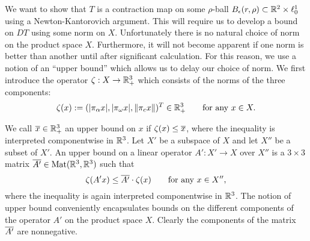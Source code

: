 We want to show that $T$ is a contraction map on some $\rho$-ball 
$B_\epsilon(r,\rho) \subset \mathbb{R}^2 \times \ell^1_0$ using a Newton-Kantorovich argument. 
This will require us to develop a bound on $DT$ using some norm on  $ X$.  
Unfortunately there is no natural choice of norm on the product space $ X$. 
Furthermore, it will not become apparent if one norm is better than another until after  significant calculation.  
For this reason, we use a notion of an ``upper bound'' which allows us to delay our choice of norm. 
We first introduce the operator $\zeta:  X  \to \mathbb{R}^3_{+}$
which consists of the norms of the three components:
\[
  \zeta(x) :=   ( |\pi_\alpha x|, |\pi_\omega x|, \|\pi_c x\| )^T \in \mathbb{R}^3_{+}
  \qquad\text{for any } x \in X.
\]
\begin{definition}\label{def:upperbound}
We call $\overline{x} \in \mathbb{R}^3_+$ an upper bound on $x$ if $\zeta(x) \leq \overline{x}$, where the inequality is interpreted componentwise in $\mathbb{R}^3$. 
Let $X'$ be a subspace of $X$ and let $X''$ be a subset of $X'$.   
An upper bound on a linear operator $A' : X' \to X $ over $X''$  is 
a $3 \times 3$ matrix $\overline{A'} \in \text{\textup{Mat}}(\mathbb{R}^3 , \mathbb{R}^3)$ such that
\[
   \zeta(A' x ) \leq \overline{A'} \cdot \zeta(x)  
     \qquad\text{for any }  x \in X'',
\]
where the inequality is again interpreted componentwise in $\mathbb{R}^3$. 
The notion of upper bound conveniently encapsulates bounds on the different components of the operator $A'$ on the product space $X$. Clearly the components of the matrix $\overline{A'}$ are nonnegative.


\end{definition}
